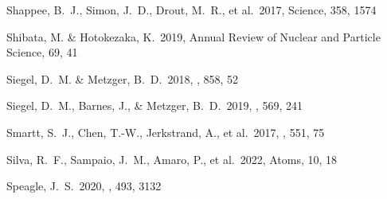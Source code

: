 \documentclass[twocolumn, twocolappendix]{aastex63}
\begin{document}
\begin{thebibliography}{}






 Shappee, B.~J., Simon, J.~D., Drout, M.~R., et al.\ 2017, Science, 358, 1574






 Shibata, M. \& Hotokezaka, K.\ 2019, Annual Review of Nuclear and Particle Science, 69, 41




 Siegel, D.~M. \& Metzger, B.~D.\ 2018, \apj, 858, 52


 Siegel, D.~M., Barnes, J., \& Metzger, B.~D.\ 2019, \nat, 569, 241


 Smartt, S.~J., Chen, T.-W., Jerkstrand, A., et al.\ 2017, \nat, 551, 75


 Silva, R.~F., Sampaio, J.~M., Amaro, P., et al.\ 2022, Atoms, 10, 18





 Speagle, J.~S.\ 2020, \mnras, 493, 3132


\end{thebibliography}
\end{document}
